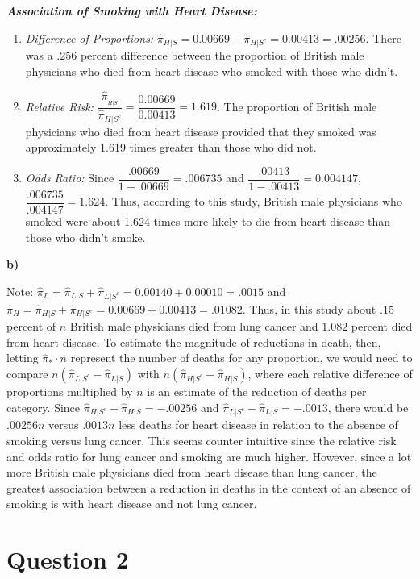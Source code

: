 \documentclass{article}
\begin{document}
\textit{\textbf{Association of Smoking with Heart Disease:}}
\begin{enumerate}
\item
    \textit{Difference of Proportions:} $\hat{\pi}_{H|S}=0.00669 - \hat{\pi}_{H|S^c}=0.00413= .00256.$ There was a $.256$ percent difference between the proportion of British male physicians who died from heart disease who smoked with those who didn't.
    \item
    \textit{Relative Risk:}
    $\dfrac{\hat{\pi}__{H|S}}{\hat{\pi}_{H|S^c}}=\dfrac{0.00669}{0.00413}=1.619$. The proportion of British male physicians who died from heart disease provided that they smoked was approximately 1.619 times greater than those who did not. 
    \item
       \textit{Odds Ratio:}
       Since $\dfrac{.00669}{1-.00669}=.006735$ and $\dfrac{.00413}{1-.00413}=0.004147$, $\dfrac{.006735}{.004147}=1.624$. Thus, according to this study, British male physicians who smoked were about 1.624 times more likely to die from heart disease than those who didn't smoke.
\end{enumerate}

\textbf{b)}

Note: $\hat{\pi}_L=\hat{\pi}_{L|S} +\hat{\pi}_{L|S^c} = 0.00140 + 0.00010 = .0015$ and $\hat{\pi}_H=\hat{\pi}_{H|S} + \hat{\pi}_{H|S^c}=0.00669 + 0.00413= .01082$. Thus, in this study about $.15$ percent of $n$ British male physicians died from lung cancer and $1.082$ percent died from heart disease. To estimate the magnitude of reductions in death, then, letting $\hat{\pi}_* \cdot n$ represent the number of deaths for any proportion, we would need to compare $n(\hat{\pi}_{L|S^c} -\hat{\pi}_{L|S})$ with $n(\hat{\pi}_{H|S^c} -\hat{\pi}_{H|S})$, where each relative difference of proportions multiplied by $n$ is an estimate of the reduction of deaths per category. Since $\hat{\pi}_{H|S^c} -\hat{\pi}_{H|S} = -.00256$ and $\hat{\pi}_{L|S^c} -\hat{\pi}_{L|S}=- .0013$, there would be $.00256n$ versus $.0013n$ less deaths for heart disease in relation to the absence of smoking versus lung cancer. This seems counter intuitive since the relative risk and odds ratio for lung cancer and smoking are much higher. However, since a lot more British male physicians died from heart disease than lung cancer, the greatest association between a reduction in deaths in the context of an absence of smoking is with heart disease and not lung cancer.

\section*{Question 2}
\end{document}
